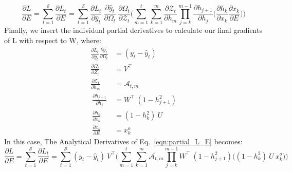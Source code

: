 \documentclass{article}
\begin{document}
\begin{equation}
\frac{\partial L}{ \partial{E}} = \sum_{t=1}^{\mathcal{S}} \frac{\partial L_t}{ \partial{E}} =
\sum_{t=1}^{\mathcal{S}}
\frac{\partial L_t}{\partial \hat{y}_t}~\frac{\partial \hat{y}_t}{\partial \Omega_t}~\frac{\partial \Omega_t}{ \partial \mathcal{Z}_t} \biggl( 
\sum_{m=1}^{t}
\sum_{k=1}^{m} \frac{\partial \mathcal{Z}_t}{ \partial h_m} 
\prod_{j=k}^{m-1} \frac{\partial h_{j+1}}{ \partial h_j} 
\biggl( \frac{\partial h_k}{ \partial x_k}\frac{\partial x_k}{ \partial E} \biggl) \biggl)
\label{eqn:partial_L_E}
\end{equation}
Finally, we insert the individual partial derivatives to calculate our final gradients of L with respect to W, where:
\begin{align*}
        \frac{\partial L_t}{\partial \hat{y}_t}\frac{\partial \hat{y}_t}{\partial \Omega_t} &= (y_t - \hat{y}_t)\\
        \frac{\partial \Omega_t}{\partial Z_t}
        &= V^\top\\
        \frac{\partial \mathcal{Z}_t}{ \partial h_m}&= \mathcal{A}_{t,m} \\
        ~\frac{\partial h_{j+1}}{\partial h_{j}}
        &= W^\top ~ (1 - h_{j+1}^2) \\
        ~\frac{\partial h_k}{\partial x_k}&= (1-h_k^2)~ U\\
        ~\frac{\partial x_k}{\partial E}&= x_k^o
\end{align*}
In this case, The Analytical Derivatives of Eq.~\eqref{eqn:partial_L_E} becomes:
\begin{equation}
	\frac{\partial L}{ \partial{E}} = \sum_{t=1}^{\mathcal{S}} \frac{\partial L_t}{ \partial{E}} =
\sum_{t=1}^{\mathcal{S}}
(y_t - \hat{y}_t)~V^\top \biggl( 
\sum_{m=1}^{t}
\sum_{k=1}^{m} \mathcal{A}_{t,m} 
\prod_{j=k}^{m-1} W^\top ~ (1 - h_{j+1}^2)
\biggl( (1-h_k^2)~ U~ x^o_k \biggl) \biggl)
 \label{eqn:partial_L_aE}
\end{equation}
\end{document}

